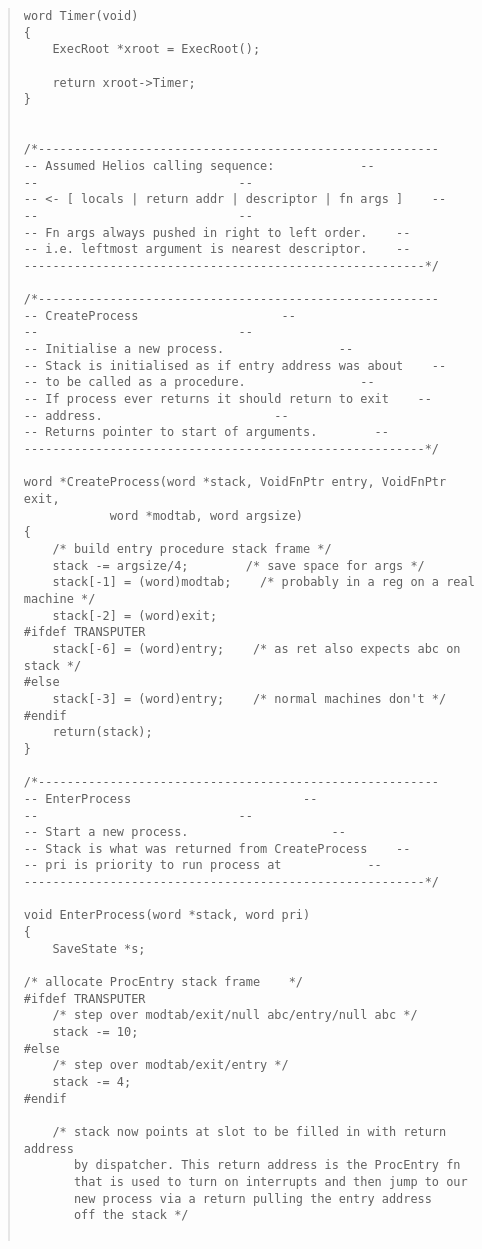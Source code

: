 \begin {quote}
\begin{verbatim}
word Timer(void)
{
    ExecRoot *xroot = ExecRoot();
    
    return xroot->Timer;
}


/*--------------------------------------------------------
-- Assumed Helios calling sequence:            --
--                            --
-- <- [ locals | return addr | descriptor | fn args ]    --
--                            --
-- Fn args always pushed in right to left order.    --
-- i.e. leftmost argument is nearest descriptor.    --
--------------------------------------------------------*/

/*--------------------------------------------------------
-- CreateProcess                    --
--                            --
-- Initialise a new process.                --
-- Stack is initialised as if entry address was about    --
-- to be called as a procedure.                --
-- If process ever returns it should return to exit    --
-- address.                        --
-- Returns pointer to start of arguments.        --
--------------------------------------------------------*/

word *CreateProcess(word *stack, VoidFnPtr entry, VoidFnPtr exit, 
            word *modtab, word argsize)
{
    /* build entry procedure stack frame */
    stack -= argsize/4;        /* save space for args */
    stack[-1] = (word)modtab;    /* probably in a reg on a real machine */
    stack[-2] = (word)exit;
#ifdef TRANSPUTER
    stack[-6] = (word)entry;    /* as ret also expects abc on stack */
#else
    stack[-3] = (word)entry;    /* normal machines don't */
#endif
    return(stack);
}

/*--------------------------------------------------------
-- EnterProcess                        --
--                            --
-- Start a new process.                    --
-- Stack is what was returned from CreateProcess    --
-- pri is priority to run process at            --
--------------------------------------------------------*/

void EnterProcess(word *stack, word pri)
{
    SaveState *s;

/* allocate ProcEntry stack frame    */
#ifdef TRANSPUTER
    /* step over modtab/exit/null abc/entry/null abc */
    stack -= 10;
#else
    /* step over modtab/exit/entry */
    stack -= 4;
#endif

    /* stack now points at slot to be filled in with return address
       by dispatcher. This return address is the ProcEntry fn
       that is used to turn on interrupts and then jump to our
       new process via a return pulling the entry address
       off the stack */


\end{verbatim}
\end{quote}
